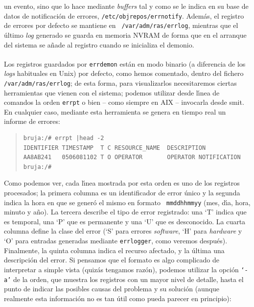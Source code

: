 un evento, sino que lo hace mediante {\it buffers} tal y como se le indica en 
su base de datos de notificaci\'on de errores, {\tt /etc/objrepos/errnotify}.
Adem\'as, el registro de errores por defecto se mantiene en {\tt 
/var/adm/ras/errlog}, mientras que el \'ultimo {\it log} generado se guarda en 
memoria NVRAM de forma que en el arranque del sistema se a\~nade al registro
cuando se inicializa el demonio.\\
\\Los registros guardados por {\tt errdemon} est\'an en modo binario (a
diferencia de los {\it logs} habituales en Unix) por defecto, como hemos
comentado, dentro del fichero 
{\tt /var/adm/ras/errlog}; de esta forma, para visualizarlos
necesitaremos ciertas herramientas que vienen con el sistema; podemos utilizar 
desde l\'{\i}nea de comandos la orden {\tt errpt} o bien -- como siempre en AIX 
-- invocarla desde {\sc smit}. En cualquier caso, mediante esta herramienta
se genera en tiempo real un informe de errores:
\begin{quote}
\begin{verbatim}
bruja:/# errpt |head -2   
IDENTIFIER TIMESTAMP  T C RESOURCE_NAME  DESCRIPTION
AA8AB241   0506081102 T O OPERATOR       OPERATOR NOTIFICATION
bruja:/#
\end{verbatim}
\end{quote}
Como podemos ver, cada l\'{\i}nea mostrada por esta orden es uno de los 
registros procesados; la primera columna es un identificador de error \'unico y
la segunda indica la hora en que se gener\'o el mismo en formato {\tt 
mmddhhmmyy} (mes, d\'{\i}a, hora, minuto y a\~no). La tercera describe el tipo
de error registrado: una `T' indica que es temporal, una `P' que es permanente y
una `U' que es desconocido. La cuarta columna define la clase del error (`S'
para errores {\it software}, `H' para {\it hardware} y `O' para entradas 
generadas mediante {\tt errlogger}, como veremos despu\'es). Finalmente, la 
quinta columna indica el recurso afectado, y la \'ultima una descripci\'on del
error. Si pensamos que el formato es algo complicado de interpretar a simple
vista (quiz\'as tengamos raz\'on), podemos utilizar la opci\'on {\tt `-a'} de
la orden, que muestra los registros con un mayor nivel de detalle, hasta el
punto de indicar las posibles causas del problema y su soluci\'on (aunque 
realmente esta informaci\'on no es tan \'util como pueda parecer en principio):
